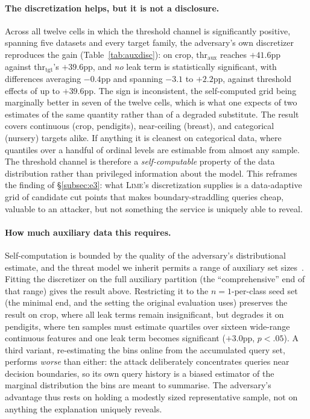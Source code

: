 \documentclass[sigconf,anonymous,review]{acmart}
\begin{document}
\paragraph{The discretization helps, but it is not a disclosure.} Across all twelve cells in which the
threshold channel is significantly positive, spanning five datasets and every target family, the adversary's own discretizer reproduces the gain (Table~\ref{tab:auxdisc}): on crop,
$\text{thr}_{\text{aux}}$ reaches $+41.6$pp against $\text{thr}_{\text{tgt}}$'s $+39.6$pp, and
\emph{no} leak term is statistically significant, with differences averaging $-0.4$pp and spanning $-3.1$
to $+2.2$pp, against threshold effects of up to $+39.6$pp. The sign is inconsistent, the self-computed
grid being marginally better in seven of the twelve cells, which is what one expects of two estimates
of the same quantity rather than of a degraded substitute.
The result covers continuous (crop, pendigits), near-ceiling (breast), and categorical (nursery) targets alike. If anything it is cleanest on categorical data, where quantiles over a handful of
ordinal levels are estimable from almost any sample. The threshold channel is therefore a
\emph{self-computable} property of the data distribution rather than privileged information about the
model. This reframes the finding of \S\ref{subsec:e3}: what \textsc{Lime}'s discretization supplies is
a data-adaptive grid of candidate cut points that makes boundary-straddling queries cheap, valuable to an attacker, but not something the service is uniquely able to reveal.

\paragraph{How much auxiliary data this requires.} Self-computation is bounded by the quality of the
adversary's distributional estimate, and the threat model we inherit permits a range of auxiliary set
sizes~\cite{oksuz2024autolycus}. Fitting the discretizer on the full auxiliary partition (the
``comprehensive'' end of that range) gives the result above. Restricting it to the $n{=}1$-per-class
seed set (the minimal end, and the setting the original evaluation uses) preserves the result on crop,
where all leak terms remain insignificant, but degrades it on pendigits, where ten samples must
estimate quartiles over sixteen wide-range continuous features and one leak term becomes significant
($+3.0$pp, $p{<}.05$). A third variant, re-estimating the bins online from the accumulated query set,
performs \emph{worse} than either: the attack deliberately concentrates queries near decision
boundaries, so its own query history is a biased estimator of the marginal distribution the bins are
meant to summarise. The adversary's advantage thus rests on holding a modestly sized representative sample, not on anything the explanation uniquely reveals.
\end{document}
